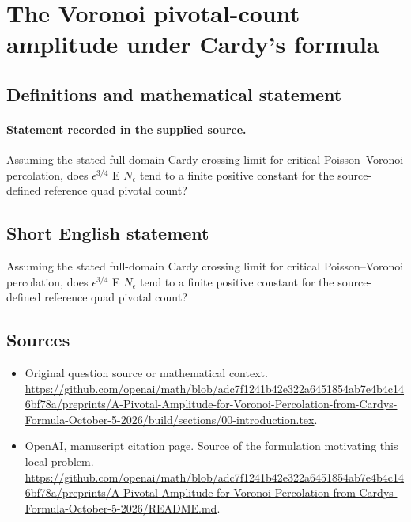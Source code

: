 \documentclass[11pt]{article}
\begin{document}
\section*{The Voronoi pivotal-count amplitude under Cardy’s formula}\label{statement}
\subsection{Definitions and mathematical statement}
\paragraph{Statement recorded in the supplied source.}
Assuming the stated full-domain Cardy crossing limit for critical Poisson–Voronoi percolation, does $\epsilon ^{3/4}$ E $N_\epsilon $ tend to a finite positive constant for the source-defined reference quad pivotal count?
\subsection{Short English statement}
Assuming the stated full-domain Cardy crossing limit for critical Poisson–Voronoi percolation, does $\epsilon ^{3/4}$ E $N_\epsilon $ tend to a finite positive constant for the source-defined reference quad pivotal count?
\subsection{Sources}
\begin{itemize}
\item[S1] Original question source or mathematical context.
\url{https://github.com/openai/math/blob/adc7f1241b42e322a6451854ab7e4b4c146bf78a/preprints/A-Pivotal-Amplitude-for-Voronoi-Percolation-from-Cardys-Formula-October-5-2026/build/sections/00-introduction.tex}.
\item[S2] OpenAI, manuscript citation page. Source of the formulation motivating this local problem.
\url{https://github.com/openai/math/blob/adc7f1241b42e322a6451854ab7e4b4c146bf78a/preprints/A-Pivotal-Amplitude-for-Voronoi-Percolation-from-Cardys-Formula-October-5-2026/README.md}.
\end{itemize}
\end{document}
